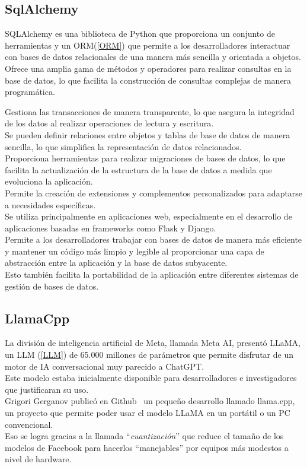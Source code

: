 \subsection{SqlAlchemy~\cite{bayer2012sqlalchemy}}
SQLAlchemy es una biblioteca de Python que proporciona un conjunto de herramientas y
 un ORM(\ref{ORM}) que permite a los desarrolladores interactuar 
con bases de datos relacionales de una manera más sencilla y orientada a objetos.\\

Ofrece una amplia gama de métodos y operadores para realizar consultas en la base de datos, 
lo que facilita la construcción de consultas complejas de manera programática.

Gestiona las transacciones de manera transparente, lo que asegura la integridad 
de los datos al realizar operaciones de lectura y escritura.\\
Se pueden definir relaciones entre objetos y tablas de base de datos de manera sencilla,
 lo que simplifica la representación de datos relacionados.\\
Proporciona herramientas para realizar migraciones de bases de datos, 
lo que facilita la actualización de la estructura de la base de datos a medida 
que evoluciona la aplicación.\\
Permite la creación de extensiones y complementos personalizados 
para adaptarse a necesidades específicas.\\
Se utiliza principalmente en aplicaciones web, 
especialmente en el desarrollo de aplicaciones basadas en frameworks como Flask y Django. \\
Permite a los desarrolladores trabajar con bases de datos de manera más eficiente y 
mantener un código más limpio y legible al proporcionar una capa de abstracción entre la 
aplicación y la base de datos subyacente.\\ 
Esto también facilita la portabilidad de la aplicación entre diferentes sistemas de 
gestión de bases de datos.\\


\subsection{LlamaCpp~\cite{metallamaLM}}
La división de inteligencia artificial de Meta, llamada Meta AI, presentó LLaMA, un LLM (\ref{LLM}) de 
65.000 millones de parámetros que permite disfrutar de un motor de 
IA conversacional muy parecido a ChatGPT.\\
Este modelo estaba inicialmente disponible para desarrolladores e investigadores 
que justificaran su uso.\\
Grigori Gerganov publicó en Github~\cite{gerganovllamaCpp} un pequeño desarrollo llamado llama.cpp,
un proyecto que permite poder usar el modelo LLaMA en un portátil o un PC convencional.\\ 
Eso se logra gracias a la llamada ``\emph{cuantización}'' que reduce el tamaño de los modelos de 
Facebook para hacerlos ``manejables'' por equipos más modestos a nivel de hardware.

